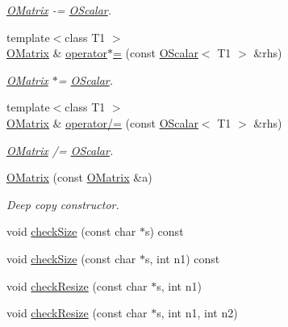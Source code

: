 \begin{DoxyCompactItemize}
\begin{DoxyCompactList}\small\item\em \mbox{\hyperlink{classENSEM_1_1OMatrix}{O\+Matrix}} -\/= \mbox{\hyperlink{classENSEM_1_1OScalar}{O\+Scalar}}. \end{DoxyCompactList}\item 
{\footnotesize template$<$class T1 $>$ }\\\mbox{\hyperlink{classENSEM_1_1OMatrix}{O\+Matrix}} \& \mbox{\hyperlink{classENSEM_1_1OMatrix_a40e18b83c9eb609f7529e65c515010c2}{operator$\ast$=}} (const \mbox{\hyperlink{classENSEM_1_1OScalar}{O\+Scalar}}$<$ T1 $>$ \&rhs)
\begin{DoxyCompactList}\small\item\em \mbox{\hyperlink{classENSEM_1_1OMatrix}{O\+Matrix}} $\ast$= \mbox{\hyperlink{classENSEM_1_1OScalar}{O\+Scalar}}. \end{DoxyCompactList}\item 
{\footnotesize template$<$class T1 $>$ }\\\mbox{\hyperlink{classENSEM_1_1OMatrix}{O\+Matrix}} \& \mbox{\hyperlink{classENSEM_1_1OMatrix_a46dc90e0e33442dcdcb9e98f9cf0025e}{operator/=}} (const \mbox{\hyperlink{classENSEM_1_1OScalar}{O\+Scalar}}$<$ T1 $>$ \&rhs)
\begin{DoxyCompactList}\small\item\em \mbox{\hyperlink{classENSEM_1_1OMatrix}{O\+Matrix}} /= \mbox{\hyperlink{classENSEM_1_1OScalar}{O\+Scalar}}. \end{DoxyCompactList}\item 
\mbox{\hyperlink{classENSEM_1_1OMatrix_a695677059e35f7e9933f2b55d2eacb52}{O\+Matrix}} (const \mbox{\hyperlink{classENSEM_1_1OMatrix}{O\+Matrix}} \&a)
\begin{DoxyCompactList}\small\item\em Deep copy constructor. \end{DoxyCompactList}\item 
void \mbox{\hyperlink{classENSEM_1_1OMatrix_abec80929ab7e8e2a23822fbbc841bd87}{check\+Size}} (const char $\ast$s) const
\item 
void \mbox{\hyperlink{classENSEM_1_1OMatrix_a8e4c3a86b8055f6e67c8fd914b2898ca}{check\+Size}} (const char $\ast$s, int n1) const
\item 
void \mbox{\hyperlink{classENSEM_1_1OMatrix_a04fb9c7a5ca8da8a54aff3a8bafec571}{check\+Resize}} (const char $\ast$s, int n1)
\item 
void \mbox{\hyperlink{classENSEM_1_1OMatrix_aa9d9ff7da2027f85535b36b472ef125b}{check\+Resize}} (const char $\ast$s, int n1, int n2)

\end{DoxyCompactItemize}
